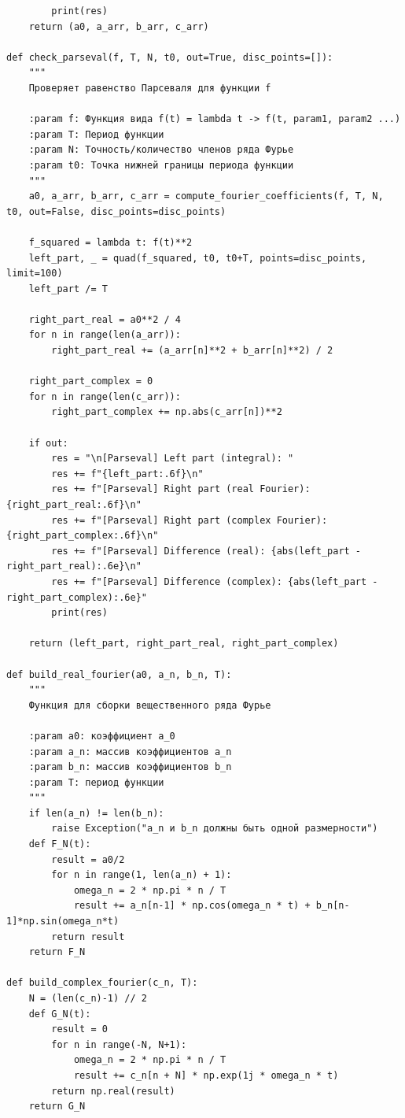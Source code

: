 \documentclass[a4paper, 12pt]{article}
\begin{document}
\begin{verbatim}
        print(res)
    return (a0, a_arr, b_arr, c_arr)

def check_parseval(f, T, N, t0, out=True, disc_points=[]):
    """
    Проверяет равенство Парсеваля для функции f
    
    :param f: Функция вида f(t) = lambda t -> f(t, param1, param2 ...)
    :param T: Период функции
    :param N: Точность/количество членов ряда Фурье
    :param t0: Точка нижней границы периода функции
    """
    a0, a_arr, b_arr, c_arr = compute_fourier_coefficients(f, T, N, t0, out=False, disc_points=disc_points)
    
    f_squared = lambda t: f(t)**2
    left_part, _ = quad(f_squared, t0, t0+T, points=disc_points, limit=100)
    left_part /= T
    
    right_part_real = a0**2 / 4
    for n in range(len(a_arr)):
        right_part_real += (a_arr[n]**2 + b_arr[n]**2) / 2
    
    right_part_complex = 0
    for n in range(len(c_arr)):
        right_part_complex += np.abs(c_arr[n])**2
    
    if out:
        res = "\n[Parseval] Left part (integral): "
        res += f"{left_part:.6f}\n"
        res += f"[Parseval] Right part (real Fourier): {right_part_real:.6f}\n"
        res += f"[Parseval] Right part (complex Fourier): {right_part_complex:.6f}\n"
        res += f"[Parseval] Difference (real): {abs(left_part - right_part_real):.6e}\n"
        res += f"[Parseval] Difference (complex): {abs(left_part - right_part_complex):.6e}"
        print(res)
    
    return (left_part, right_part_real, right_part_complex)

def build_real_fourier(a0, a_n, b_n, T):
    """
    Функция для сборки вещественного ряда Фурье
    
    :param a0: коэффициент a_0
    :param a_n: массив коэффициентов a_n
    :param b_n: массив коэффициентов b_n
    :param T: период функции
    """
    if len(a_n) != len(b_n):
        raise Exception("a_n и b_n должны быть одной размерности")
    def F_N(t):
        result = a0/2
        for n in range(1, len(a_n) + 1):
            omega_n = 2 * np.pi * n / T
            result += a_n[n-1] * np.cos(omega_n * t) + b_n[n-1]*np.sin(omega_n*t)
        return result
    return F_N

def build_complex_fourier(c_n, T):
    N = (len(c_n)-1) // 2
    def G_N(t):
        result = 0
        for n in range(-N, N+1):
            omega_n = 2 * np.pi * n / T
            result += c_n[n + N] * np.exp(1j * omega_n * t)
        return np.real(result)
    return G_N


\end{verbatim}
\end{document}
